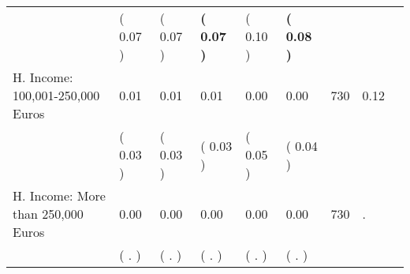 \begin{tabular}{L{6.2cm} C{1.8cm} C{1.8cm} C{1.8cm} C{1.8cm} C{1.8cm} C{1.8cm} C{0.3cm} C{0.3cm}}
 & (     0.07 ) & (     0.07 ) & \textbf{(     0.07 )} & (     0.10 ) & \textbf{(     0.08 )}  & \\
H. Income: 100,001-250,000 Euros &      0.01 &      0.01 &      0.01 &      0.00 &      0.00  & 730 &       0.12 \\ 
 & (     0.03 ) & (     0.03 ) & (     0.03 ) & (     0.05 ) & (     0.04 )  & \\
H. Income: More than 250,000 Euros &      0.00 &      0.00 &      0.00 &      0.00 &      0.00  & 730 &          . \\ 
 & (        . ) & (        . ) & (        . ) & (        . ) & (        . )  & \\
\bottomrule
\end{tabular}
